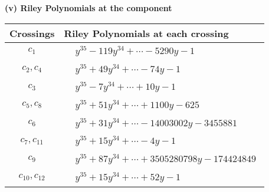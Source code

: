 \documentclass[1p]{elsarticle_modified}
\theoremstyle{definition}
\begin{document}
\newpage\renewcommand{\arraystretch}{1}
\flushleft \textbf{(v) Riley Polynomials at the component}\newline \\
\begin{tabular}{m{50pt}|m{274pt}}
Crossings & \hspace{64pt}Riley Polynomials at each crossing \\
\hline $$\begin{aligned}c_{1}\end{aligned}$$&$\begin{aligned}
&y^{35}-119 y^{34}+\cdots-5290 y-1
\end{aligned}$\\
\hline $$\begin{aligned}c_{2},c_{4}\end{aligned}$$&$\begin{aligned}
&y^{35}+49 y^{34}+\cdots-74 y-1
\end{aligned}$\\
\hline $$\begin{aligned}c_{3}\end{aligned}$$&$\begin{aligned}
&y^{35}-7 y^{34}+\cdots+10 y-1
\end{aligned}$\\
\hline $$\begin{aligned}c_{5},c_{8}\end{aligned}$$&$\begin{aligned}
&y^{35}+51 y^{34}+\cdots+1100 y-625
\end{aligned}$\\
\hline $$\begin{aligned}c_{6}\end{aligned}$$&$\begin{aligned}
&y^{35}+31 y^{34}+\cdots-14003002 y-3455881
\end{aligned}$\\
\hline $$\begin{aligned}c_{7},c_{11}\end{aligned}$$&$\begin{aligned}
&y^{35}+15 y^{34}+\cdots-4 y-1
\end{aligned}$\\
\hline $$\begin{aligned}c_{9}\end{aligned}$$&$\begin{aligned}
&y^{35}+87 y^{34}+\cdots+3505280798 y-174424849
\end{aligned}$\\
\hline $$\begin{aligned}c_{10},c_{12}\end{aligned}$$&$\begin{aligned}
&y^{35}+15 y^{34}+\cdots+52 y-1
\end{aligned}$\\
\hline
\end{tabular}\\~\\
\end{document}
